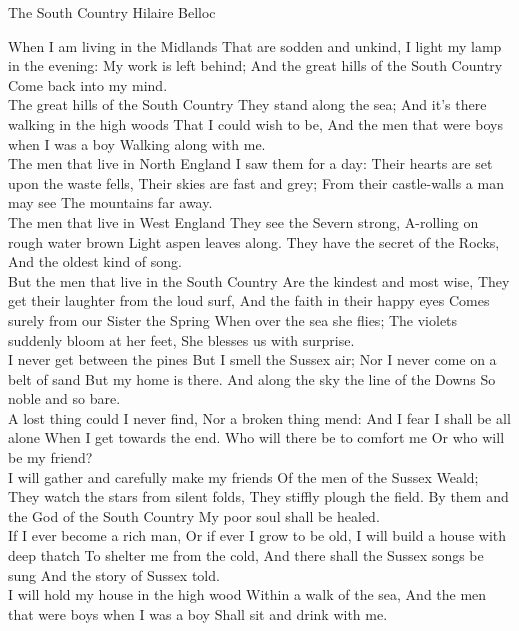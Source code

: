 \begin{poem}
{The South Country}
{Hilaire Belloc}

When I am living in the Midlands
That are sodden and unkind,
I light my lamp in the evening:
My work is left behind;
And the great hills of the South Country
Come back into my mind.\\

The great hills of the South Country
They stand along the sea;
And it's there walking in the high woods
That I could wish to be,
And the men that were boys when I was a boy
Walking along with me.\\

The men that live in North England
I saw them for a day:
Their hearts are set upon the waste fells,
Their skies are fast and grey;
From their castle-walls a man may see
The mountains far away.\\

The men that live in West England
They see the Severn strong,
A-rolling on rough water brown
Light aspen leaves along.
They have the secret of the Rocks,
And the oldest kind of song.\\

But the men that live in the South Country
Are the kindest and most wise,
They get their laughter from the loud surf,
And the faith in their happy eyes
Comes surely from our Sister the Spring
When over the sea she flies;
The violets suddenly bloom at her feet,
She blesses us with surprise.\\

I never get between the pines
But I smell the Sussex air;
Nor I never come on a belt of sand
But my home is there.
And along the sky the line of the Downs
So noble and so bare.\\

A lost thing could I never find,
Nor a broken thing mend:
And I fear I shall be all alone
When I get towards the end.
Who will there be to comfort me
Or who will be my friend?\\

I will gather and carefully make my friends
Of the men of the Sussex Weald;
They watch the stars from silent folds,
They stiffly plough the field.
By them and the God of the South Country
My poor soul shall be healed.\\

If I ever become a rich man,
Or if ever I grow to be old,
I will build a house with deep thatch
To shelter me from the cold,
And there shall the Sussex songs be sung
And the story of Sussex told.\\

I will hold my house in the high wood
Within a walk of the sea,
And the men that were boys when I was a boy
Shall sit and drink with me.\\
\end{poem}

